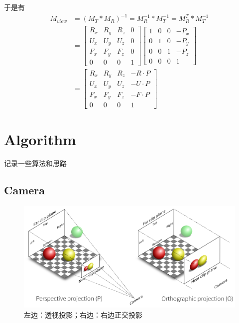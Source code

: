 于是有
\begin{equation*}
    \begin{split}
        M_{view} &= (M_{T} \ast M_{R})^{-1} = M_{R}^{-1} \ast M_{T}^{-1} = M_{R}^{T} \ast M_{T}^{-1} \\
        &= \begin{bmatrix}
            R_{x} & R_{y} & R_{z} & 0 \\ 
            U_{x} & U_{y} & U_{z} & 0 \\
            F_{x} & F_{y} & F_{z} & 0 \\
            0 & 0 & 0 & 1
        \end{bmatrix}
        \begin{bmatrix}
            1 & 0 & 0 & -P_{x} \\ 
            0 & 1 & 0 & -P_{y} \\
            0 & 0 & 1 & -P_{z} \\
            0 & 0 & 0 & 1
        \end{bmatrix} \\
        &= \begin{bmatrix}
            R_{x} & R_{y} & R_{z} & -R \cdot P \\ 
            U_{x} & U_{y} & U_{z} & -U \cdot P \\
            F_{x} & F_{y} & F_{z} & -F \cdot P \\
            0 & 0 & 0 & 1
        \end{bmatrix}
    \end{split} 
\end{equation*}


\chapter{Algorithm}
记录一些算法和思路

\section{Camera}

\begin{figure}[h]
    \centering
    \includegraphics[width=1\textwidth]{images/camera-perspective-and-orthographic.png}
    \caption{左边：透视投影；右边：右边正交投影}    
\end{figure}

